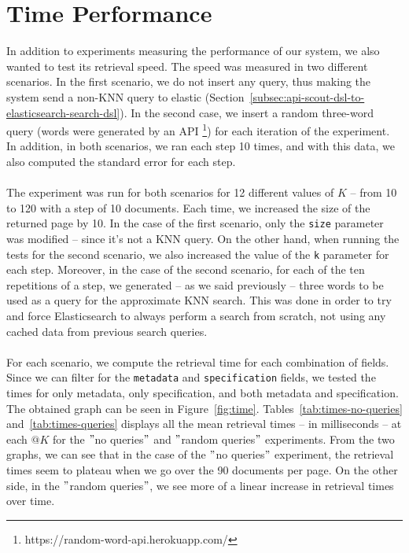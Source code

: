 \section{Time Performance}\label{sec:time-performance}
In addition to experiments measuring the performance of our system, we also wanted to test its retrieval speed.
The speed was measured in two different scenarios.
In the first scenario, we do not insert any query, thus making the system send a non-KNN query to elastic (Section~\ref{subsec:api-scout-dsl-to-elasticsearch-search-dsl}).
In the second case, we insert a random three-word query (words were generated by an API \footnote{https://random-word-api.herokuapp.com/
}) for each iteration of the experiment.
In addition, in both scenarios, we ran each step 10 times, and with this data, we also computed the standard error for each step.\\ \\
The experiment was run for both scenarios for 12 different values of $K$ -- from 10 to 120 with a step of 10 documents.
Each time, we increased the size of the returned page by 10.
In the case of the first scenario, only the \verb|size| parameter was modified -- since it's not a KNN query.
On the other hand, when running the tests for the second scenario, we also increased the value of the \verb|k| parameter for each step.
Moreover, in the case of the second scenario, for each of the ten repetitions of a step, we generated -- as we said previously -- three words to be used as a query for the approximate KNN search.
This was done in order to try and force Elasticsearch to always perform a search from scratch, not using any cached data from previous search queries. \\ \\
For each scenario, we compute the retrieval time for each combination of fields.
Since we can filter for the \verb|metadata| and \verb|specification| fields, we tested the times for only metadata, only specification, and both metadata and specification.
The obtained graph can be seen in Figure~\ref{fig:time}.
Tables~\ref{tab:times-no-queries} and~\ref{tab:times-queries} displays all the mean retrieval times -- in milliseconds -- at each $@K$ for the \("\)no queries\("\) and \("\)random queries\("\) experiments.
From the two graphs, we can see that in the case of the \("\)no queries\("\) experiment, the retrieval times seem to plateau when we go over the 90 documents per page.
On the other side, in the \("\)random queries\("\), we see more of a linear increase in retrieval times over time.

